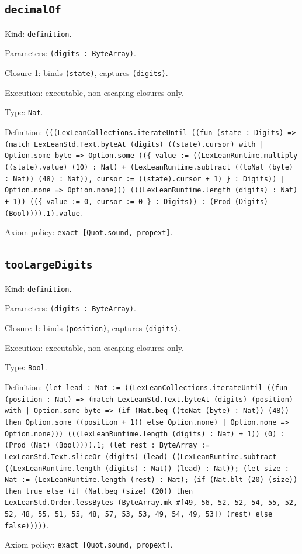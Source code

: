 \documentclass[11pt]{article}
\begin{document}
\subsection*{\texttt{decimalOf}}
\noindent Kind: \texttt{definition}.\par
\noindent Parameters: \texttt{(digits : ByteArray)}.\par
\noindent Closure 1: binds \texttt{(state)}, captures \texttt{(digits)}.\par
\noindent Execution: executable, non-escaping closures only.\par
\noindent Type: \texttt{Nat}.\par
\noindent Definition: \texttt{(((LexLeanCollections.iterateUntil ((fun (state : Digits) => (match LexLeanStd.Text.byteAt (digits) ((state).cursor) with | Option.some byte => Option.some ((\{ value := ((LexLeanRuntime.multiply ((state).value) (10) : Nat) + (LexLeanRuntime.subtract ((toNat (byte) : Nat)) (48) : Nat)), cursor := ((state).cursor + 1) \} : Digits)) | Option.none => Option.none))) (((LexLeanRuntime.length (digits) : Nat) + 1)) ((\{ value := 0, cursor := 0 \} : Digits)) : (Prod (Digits) (Bool)))).1).value}.\par
\noindent Axiom policy: \texttt{exact [Quot.sound, propext]}.\par
\subsection*{\texttt{tooLargeDigits}}
\noindent Kind: \texttt{definition}.\par
\noindent Parameters: \texttt{(digits : ByteArray)}.\par
\noindent Closure 1: binds \texttt{(position)}, captures \texttt{(digits)}.\par
\noindent Execution: executable, non-escaping closures only.\par
\noindent Type: \texttt{Bool}.\par
\noindent Definition: \texttt{(let lead : Nat := ((LexLeanCollections.iterateUntil ((fun (position : Nat) => (match LexLeanStd.Text.byteAt (digits) (position) with | Option.some byte => (if (Nat.beq ((toNat (byte) : Nat)) (48)) then Option.some ((position + 1)) else Option.none) | Option.none => Option.none))) (((LexLeanRuntime.length (digits) : Nat) + 1)) (0) : (Prod (Nat) (Bool)))).1; (let rest : ByteArray := LexLeanStd.Text.sliceOr (digits) (lead) ((LexLeanRuntime.subtract ((LexLeanRuntime.length (digits) : Nat)) (lead) : Nat)); (let size : Nat := (LexLeanRuntime.length (rest) : Nat); (if (Nat.blt (20) (size)) then true else (if (Nat.beq (size) (20)) then LexLeanStd.Order.lessBytes (ByteArray.mk \#[49, 56, 52, 52, 54, 55, 52, 52, 48, 55, 51, 55, 48, 57, 53, 53, 49, 54, 49, 53]) (rest) else false)))))}.\par
\noindent Axiom policy: \texttt{exact [Quot.sound, propext]}.\par
\end{document}
